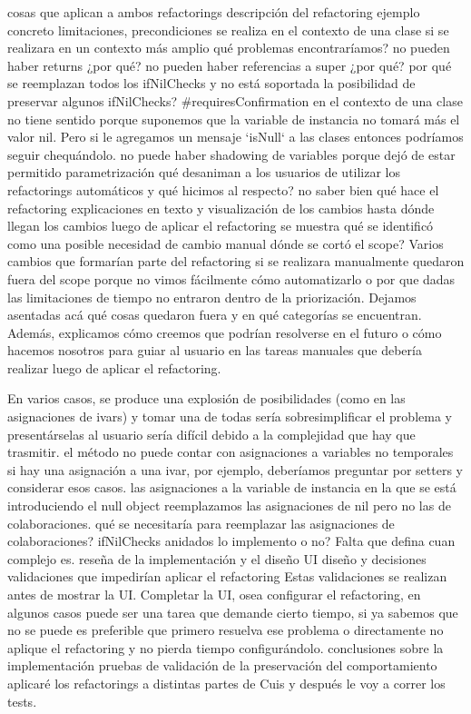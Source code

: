 cosas que aplican a ambos refactorings
    descripción del refactoring
    ejemplo concreto
    limitaciones, precondiciones
        se realiza en el contexto de una clase
        si se realizara en un contexto más amplio qué problemas encontraríamos?
        no pueden haber returns
        ¿por qué?
        no pueden haber referencias a super
        ¿por qué?
        por qué se reemplazan todos los ifNilChecks y no está soportada la posibilidad de preservar algunos ifNilChecks? \#requiresConfirmation 
        en el contexto de una clase no tiene sentido porque suponemos que la variable de instancia no tomará más el valor nil. Pero si le agregamos un mensaje `isNull` a las clases entonces podríamos seguir chequándolo.
        no puede haber shadowing de variables porque dejó de estar permitido
    parametrización
    qué desaniman a los usuarios de utilizar los refactorings automáticos y qué hicimos al respecto?
        no saber bien qué hace el refactoring
        explicaciones en texto y visualización de los cambios
        hasta dónde llegan los cambios
        luego de aplicar el refactoring se muestra qué se identificó como una posible necesidad de cambio manual
    dónde se cortó el scope?
    Varios cambios que formarían parte del refactoring si se realizara manualmente quedaron fuera del scope porque no vimos fácilmente cómo automatizarlo o por que dadas las limitaciones de tiempo no entraron dentro de la priorización. Dejamos asentadas acá qué cosas quedaron fuera y en qué categorías se encuentran. Además, explicamos cómo creemos que podrían resolverse en el futuro o cómo hacemos nosotros para guiar al usuario en las tareas manuales que debería realizar luego de aplicar el refactoring.

En varios casos, se produce una explosión de posibilidades (como en las asignaciones de ivars) y tomar una de todas sería sobresimplificar el problema y presentárselas al usuario sería difícil debido a la complejidad que hay que trasmitir.
        el método no puede contar con asignaciones a variables no temporales
        si hay una asignación a una ivar, por ejemplo, deberíamos preguntar por setters y considerar esos casos.
        las asignaciones a la variable de instancia en la que se está introduciendo el null object
        reemplazamos las asignaciones de nil pero no las de colaboraciones.
            qué se necesitaría para reemplazar las asignaciones de colaboraciones?
        ifNilChecks anidados
        lo implemento o no? Falta que defina cuan complejo es.
    reseña de la implementación y el diseño
    UI diseño y decisiones
        validaciones que impedirían aplicar el refactoring
        Estas validaciones se realizan antes de mostrar la UI. Completar la UI, osea configurar el refactoring, en algunos casos puede ser una tarea que demande cierto tiempo, si ya sabemos que no se puede es preferible que primero resuelva ese problema o directamente no aplique el refactoring y no pierda tiempo configurándolo.
    conclusiones sobre la implementación
    pruebas de validación de la preservación del comportamiento
    aplicaré los refactorings a distintas partes de Cuis y después le voy a correr los tests.


